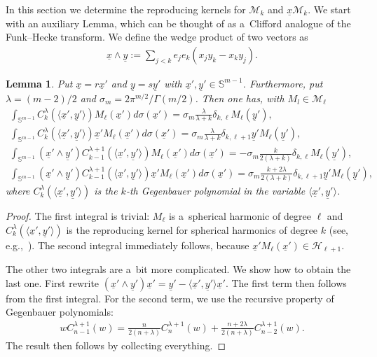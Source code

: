 \documentclass[11pt]{article}
\newtheorem{lemma}{Lemma}
\numberwithin{equation}{section}
\numberwithin{theorem}{section}
\numberwithin{proposition}{section}
\numberwithin{lemma}{section}
\numberwithin{corollary}{section}
\numberwithin{definition}{section}
\numberwithin{example}{section}
\numberwithin{remark}{section}
\numberwithin{note}{section}
\theoremstyle{remark}
\newcommand{\mS}{\mathbb{S}}
\newcommand{\cM}{\mathcal{M}}
\newcommand{\cH}{\mathcal{H}}
\newcommand{\ux}{\underline{x}}
\newcommand{\uy}{\underline{y}}
\def\l{{\lambda}}
\def\s{{\sigma}}
\def\la{{\langle}}
\def\ra{{\rangle}}
\begin{document}
In this section we determine the reproducing kernels for $\cM_{k}$ and $\ux\cM_{k}$.
We start with an auxiliary Lemma, which can be thought of as a~Clif\/ford analogue
of the Funk--Hecke transform.
We def\/ine the wedge product of two vectors as
\begin{gather*}
\ux\wedge\uy:=\sum_{j<k}e_{j}e_{k}(x_{j}y_{k}-x_{k}y_{j}).
\end{gather*}

\begin{lemma}
\label{auxintegrals}
Put $\ux=r\ux'$ and $\uy=s\uy'$ with $\ux',\uy'\in\mS^{m-1}$.
Furthermore, put $\lambda=(m-2)/2$ and $\sigma_m=2\pi^{m/2}/\Gamma(m/2)$.
Then one has, with $M_{l}\in\cM_{\ell}$
\begin{gather*}
\int_{\mS^{m-1}} C_{k}^{\lambda}(\la\ux', \uy' \ra) M_{\ell}(\ux')d \s (\ux') = \sigma_m
\frac{\l}{\l+k} \delta_{k, \ell} M_{\ell}(\uy'),\\
\int_{\mS^{m-1}} C_{k}^{\lambda}(\la\ux', \uy' \ra) \ux' M_{\ell}(\ux')d \s (\ux') = \sigma_m
\frac{\l}{\l+k} \delta_{k, \ell+1} \uy' M_{\ell}(\uy'),\\
\int_{\mS^{m-1}} (\ux' \wedge \uy' ) C_{k-1}^{\lambda+1}(\la\ux', \uy' \ra) M_{\ell}(\ux')d \s
(\ux') = - \sigma_m \frac{k}{2(\l+k)} \delta_{k, \ell} M_{\ell}(\uy'),\\
\int_{\mS^{m-1}} (\ux' \wedge \uy' ) C_{k-1}^{\lambda+1}(\la\ux', \uy' \ra) \ux' M_{\ell}(\ux')d
\s (\ux') = \sigma_m \frac{k+2\l}{2(\l+k)} \delta_{k, \ell+1} \uy' M_{\ell}(\uy'),
\end{gather*}
where $C_{k}^{\lambda}(\la\ux',\uy'\ra)$ is the $k$-th Gegenbauer polynomial in the variable
$\la\ux',\uy'\ra$.
\end{lemma}

\begin{proof}
The f\/irst integral is trivial: $M_{\ell}$ is a~spherical harmonic of degree $\ell$ and
$C_{k}^{\lambda}(\la\ux',\uy'\ra)$ is the reproducing kernel for spherical harmonics of degree
$k$ (see, e.g.,~\cite{MR1827871}).
The second integral immediately follows, because $\ux'M_{\ell}(\ux')\in\cH_{\ell+1}$.

The other two integrals are a~bit more complicated.
We show how to obtain the last one.
First rewrite
$(\ux'\wedge\uy')\ux'=\uy'-\la\ux',\uy'\ra\ux'$.
The f\/irst term then follows from the f\/irst integral.
For the second term, we use the recursive property of Gegenbauer polynomials:
\begin{gather*}%
w C^{\l+1}_{n-1}(w)=\frac{n}{2(n+\l)}C^{\l+1}_{n}(w)+\frac{n+2\l}{2(n+\l)}
C^{\l+1}_{n-2}(w).
\end{gather*}
The result then follows by collecting everything.
\end{proof}
\end{document}
